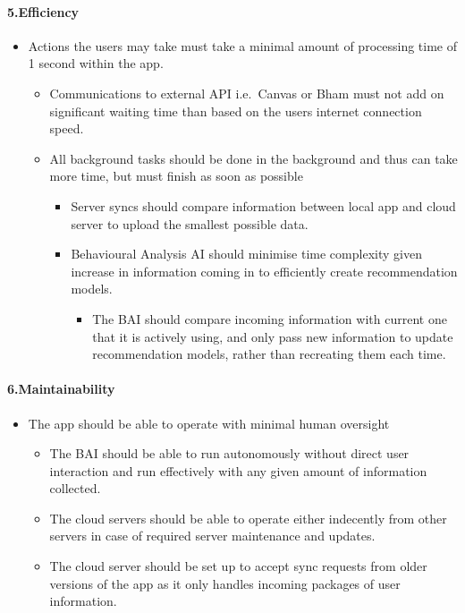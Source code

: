\documentclass[a4paper,11pt]{article} %
\begin{document}
\hypertarget{efficiency}{%
\paragraph{5.Efficiency}\label{efficiency}}

\begin{itemize}
\item
  Actions the users may take must take a minimal amount of processing
  time of 1 second within the app.

  \begin{itemize}
  \item
    Communications to external API i.e.~Canvas or Bham must not add on
    significant waiting time than based on the users internet connection
    speed.
  \item
    All background tasks should be done in the background and thus can
    take more time, but must finish as soon as possible

    \begin{itemize}
    \item
      Server syncs should compare information between local app and
      cloud server to upload the smallest possible data.
    \item
      Behavioural Analysis AI should minimise time complexity given
      increase in information coming in to efficiently create
      recommendation models.

      \begin{itemize}
      \item
        The BAI should compare incoming information with current one
        that it is actively using, and only pass new information to
        update recommendation models, rather than recreating them each
        time.
      \end{itemize}
    \end{itemize}
  \end{itemize}
\end{itemize}

\hypertarget{maintainability}{%
\paragraph{6.Maintainability}\label{maintainability}}

\begin{itemize}
\item
  The app should be able to operate with minimal human oversight

  \begin{itemize}
  \item
    The BAI should be able to run autonomously without direct user
    interaction and run effectively with any given amount of information
    collected.
  \item
    The cloud servers should be able to operate either indecently from
    other servers in case of required server maintenance and updates.
  \item
    The cloud server should be set up to accept sync requests from older
    versions of the app as it only handles incoming packages of user
    information.
  \end{itemize}
\end{itemize}
\end{document}
